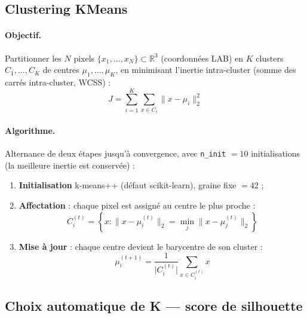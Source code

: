\documentclass[11pt,a4paper]{article}
\begin{document}
\subsection{Clustering KMeans}

\paragraph{Objectif.}
Partitionner les $N$ pixels $\{x_1, \dots, x_N\} \subset \mathbb{R}^3$
(coordonnées LAB) en $K$ clusters $C_1, \dots, C_K$ de centres
$\mu_1, \dots, \mu_K$, en minimisant l'inertie intra-cluster (somme des
carrés intra-cluster, WCSS) :
\begin{equation}
  J = \sum_{i=1}^{K} \sum_{x \in C_i} \lVert x - \mu_i \rVert_2^2
  \label{eq:wcss}
\end{equation}

\paragraph{Algorithme.}
Alternance de deux étapes jusqu'à convergence, avec
\texttt{n\_init} $= 10$ initialisations (la meilleure inertie est
conservée) :
\begin{enumerate}
  \item \textbf{Initialisation} k-means++ (défaut scikit-learn), graine
        fixe $= 42$ ;
  \item \textbf{Affectation} : chaque pixel est assigné au centre le plus
        proche :
  \begin{equation}
    C_i^{(t)} = \left\{ x : \lVert x - \mu_i^{(t)} \rVert_2 = \min_{j}
    \lVert x - \mu_j^{(t)} \rVert_2 \right\}
    \label{eq:assign}
  \end{equation}
  \item \textbf{Mise à jour} : chaque centre devient le barycentre de son
        cluster :
  \begin{equation}
    \mu_i^{(t+1)} = \frac{1}{\lvert C_i^{(t)} \rvert}
    \sum_{x \in C_i^{(t)}} x
    \label{eq:update}
  \end{equation}
\end{enumerate}

\subsection{Choix automatique de K --- score de silhouette}
\end{document}
